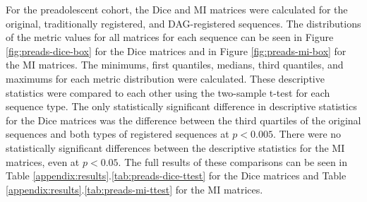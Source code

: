 For the preadolescent cohort, the Dice and MI matrices were calculated for the original, traditionally registered, and DAG-registered sequences. The distributions of the metric values for all matrices for each sequence can be seen in Figure \ref{fig:preads-dice-box} for the Dice matrices and in Figure \ref{fig:preads-mi-box} for the MI matrices. The minimums, first quantiles, medians, third quantiles, and maximums for each metric distribution were calculated. These descriptive statistics were compared to each other using the two-sample t-test for each sequence type. The only statistically significant difference in descriptive statistics for the Dice matrices was the difference between the third quartiles of the original sequences and both types of registered sequences at $p < 0.005$. There were no statistically significant differences between the descriptive statistics for the MI matrices, even at $p < 0.05$. The full results of these comparisons can be seen in Table \ref{appendix:results}.\ref{tab:preads-dice-ttest} for the Dice matrices and Table \ref{appendix:results}.\ref{tab:preads-mi-ttest} for the MI matrices.

